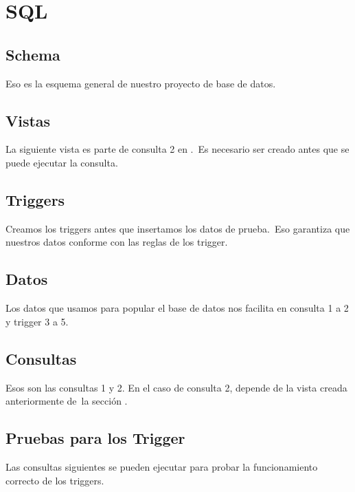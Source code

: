 \documentclass[12pt]{article}
\begin{document}
\section{SQL}
\label{sec:sql}
\subsection{Schema}
\label{sec:schema}
Eso es la esquema general de nuestro proyecto de base de datos.\\


\newpage
\subsection{Vistas}
\label{sec:vistas}
La siguiente vista es parte de consulta 2 en .\
Es necesario ser creado antes que se puede ejecutar la consulta.\\


\newpage
\subsection{Triggers}
\label{sec:triggers}
Creamos los triggers antes que insertamos los datos de prueba.\
Eso garantiza que nuestros datos conforme con las reglas de los trigger.\\


\newpage
\subsection{Datos}
\label{sec:datos}
Los datos que usamos para popular el base de datos nos facilita en consulta 1 a 2 y trigger 3 a 5.


\newpage
\subsection{Consultas}
\label{sec:consultas}
Esos son las consultas 1 y 2. En el caso de consulta 2, depende de la vista creada anteriormente de\
la sección .


\newpage
\subsection{Pruebas para los Trigger}
\label{sec:pruebas}
Las consultas siguientes se pueden ejecutar para probar la funcionamiento correcto de los triggers.\\

\end{document}
